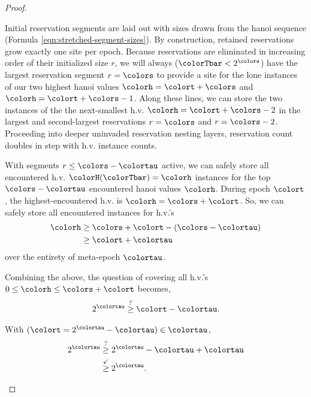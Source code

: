 \begin{proof}
\begin{proofpart}
Initial reservation segments are laid out with sizes drawn from the hanoi sequence (Formula \ref{eqn:stretched-segment-sizes}).
By construction, retained reservations grow exactly one site per epoch.
Because reservations are eliminated in increasing order of their initialized size $r$, we will always ($\colorTbar < 2^{\colors}$) have the largest reservation segment $r=\colors$ to provide a site for the lone instances of our two highest hanoi values $\colorh=\colort+\colors$ and $\colorh=\colort+\colors-1$.
Along these lines, we can store the two instances of the the next-smallest h.v. $\colorh=\colort+\colors-2$ in the largest and second-largest reservations $r=\colors$ and $r=\colors-2$.
Proceeding into deeper uninvaded reservation nesting layers, reservation count doubles in step with h.v. instance counts.

With segments $r \leq \colors - \colortau$ active, we can safely store all encountered h.v. $\colorH(\colorTbar) = \colorh$ instances for the top $\colors - \colortau$ encountered hanoi values $\colorh$.
During epoch $\colort$, the highest-encountered h.v. is $\colorh=\colors + \colort$.
So, we can safely store all encountered instances for h.v.'s
\begin{align*}
\colorh
&\geq
\colors + \colort - (\colors - \colortau)\\
&\geq
\colort + \colortau
\end{align*}
over the entirety of meta-epoch $\colortau$.
\end{proofpart}

\begin{proofpart}
Combining the above, the question of covering all h.v.'s $0\leq\colorh\leq\colors+\colort$ becomes,
\begin{align*}
2^{\colortau}
\stackrel{?}{\geq} \colort - \colortau.
\end{align*}

With $(\colort = 2^{\colortau} - \colortau) \in \colortau$,
\begin{align*}
2^{\colortau}
&\stackrel{?}{\geq} 2^{\colortau} - \colortau + \colortau \\
&\stackrel{\checkmark}{\geq} 2^{\colortau}.
\end{align*}
\end{proofpart}

\end{proof}
